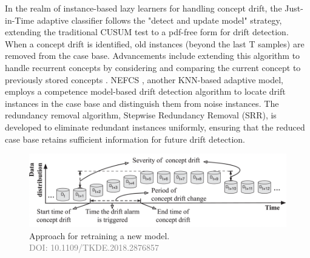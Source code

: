 \begin{enumerate}[label=\Alph*.]
    In the realm of instance-based lazy learners for handling concept drift, the Just-in-Time adaptive classifier \cite{alippi2008just}  follows the "detect and update model" strategy, extending the traditional CUSUM test \cite{manly2000cumulative} to a pdf-free form for drift detection. When a concept drift is identified, old instances (beyond the last T samples) are removed from the case base. Advancements include extending this algorithm to handle recurrent concepts by considering and comparing the current concept to previously stored concepts \cite{silva2013data, alippi2008just}. NEFCS \cite{lu2016concept}, another KNN-based adaptive model, employs a competence model-based drift detection algorithm \cite{lu2016concept} to locate drift instances in the case base and distinguish them from noise instances. The redundancy removal algorithm, Stepwise Redundancy Removal (SRR), is developed to eliminate redundant instances uniformly, ensuring that the reduced case base retains sufficient information for future drift detection.
    

\begin{figure}[!ht]
    \centering
    \includegraphics[width=.9\textwidth]{2_Background/figures/concept_drift_understanding.png}
    \caption{Approach for retraining a new model. \\ \textcolor{gray}{\fontsize{10}{0}\selectfont DOI: 10.1109/TKDE.2018.2876857}}
    \label{fig:concept-drift-adaptation}
\end{figure}






\end{enumerate}
